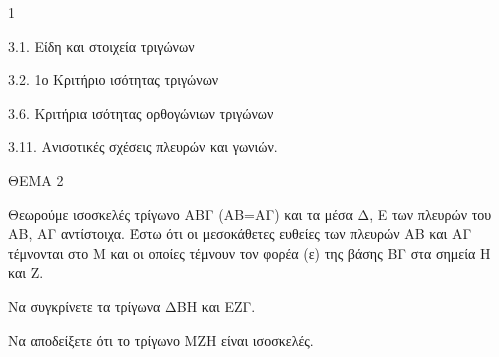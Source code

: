 \begin{ylh}{1}
    \item 3.1. Είδη και στοιχεία τριγώνων
    \item 3.2. 1ο Κριτήριο ισότητας τριγώνων
    \item 3.6. Κριτήρια ισότητας ορθογώνιων τριγώνων
    \item 3.11. Ανισοτικές σχέσεις πλευρών και γωνιών.
\end{ylh}

ΘΕΜΑ 2

Θεωρούμε ισοσκελές τρίγωνο ΑΒΓ (ΑΒ=ΑΓ) και τα μέσα Δ, Ε των πλευρών του ΑΒ, ΑΓ αντίστοιχα. Έστω ότι οι μεσοκάθετες ευθείες των πλευρών ΑΒ και ΑΓ τέμνονται στο Μ και οι οποίες τέμνουν τον φορέα (ε) της βάσης ΒΓ στα σημεία Η και Ζ.

\begin{alist}
\item Να συγκρίνετε τα τρίγωνα ΔΒΗ και ΕΖΓ. 

\item Να αποδείξετε ότι το τρίγωνο ΜΖΗ είναι ισοσκελές. 


\begin{center}
\end{center}
\end{alist}
